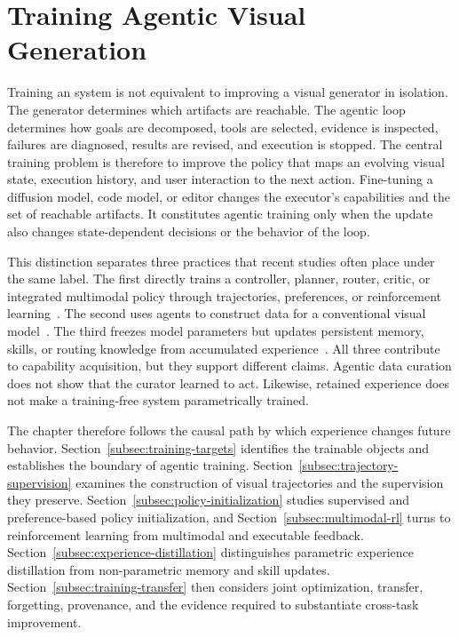 \section{Training Agentic Visual Generation}
\label{sec:training}

Training an \AVG{} system is not equivalent to improving a visual generator in isolation. The generator determines which artifacts are reachable. The agentic loop determines how goals are decomposed, tools are selected, evidence is inspected, failures are diagnosed, results are revised, and execution is stopped. The central training problem is therefore to improve the policy that maps an evolving visual state, execution history, and user interaction to the next action. Fine-tuning a diffusion model, code model, or editor changes the executor's capabilities and the set of reachable artifacts. It constitutes agentic training only when the update also changes state-dependent decisions or the behavior of the loop.

This distinction separates three practices that recent studies often place under the same label. The first directly trains a controller, planner, router, critic, or integrated multimodal policy through trajectories, preferences, or reinforcement learning~\cite{avg260328767,avg260327742,jiang2026genagent,avg260302681,avg260517969,avg260308059,avg260705465}. The second uses agents to construct data for a conventional visual model~\cite{avg260320644,avg260603168,avg260631537}. The third freezes model parameters but updates persistent memory, skills, or routing knowledge from accumulated experience~\cite{avg260628971,avg260202051,jiang2026octot2i,avg260701709,avg260522208}. All three contribute to capability acquisition, but they support different claims. Agentic data curation does not show that the curator learned to act. Likewise, retained experience does not make a training-free system parametrically trained.

The chapter therefore follows the causal path by which experience changes future behavior. Section~\ref{subsec:training-targets} identifies the trainable objects and establishes the boundary of agentic training. Section~\ref{subsec:trajectory-supervision} examines the construction of visual trajectories and the supervision they preserve. Section~\ref{subsec:policy-initialization} studies supervised and preference-based policy initialization, and Section~\ref{subsec:multimodal-rl} turns to reinforcement learning from multimodal and executable feedback. Section~\ref{subsec:experience-distillation} distinguishes parametric experience distillation from non-parametric memory and skill updates. Section~\ref{subsec:training-transfer} then considers joint optimization, transfer, forgetting, provenance, and the evidence required to substantiate cross-task improvement.

